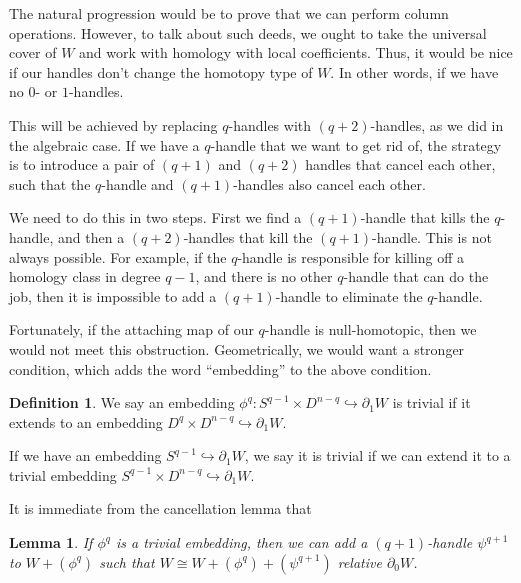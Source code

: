\documentclass[a4paper, 12pt]{article}
\newtheorem{lemma}[thm]{Lemma}
\theoremstyle{definition}
\newtheorem{defi}[thm]{Definition}
\newcommand\fakeqed{\pushQED{\qed}\qedhere}
\begin{document}
The natural progression would be to prove that we can perform column operations. However, to talk about such deeds, we ought to take the universal cover of $W$ and work with homology with local coefficients. Thus, it would be nice if our handles don't change the homotopy type of $W$. In other words, if we have no $0$- or $1$-handles.

This will be achieved by replacing $q$-handles with $(q + 2)$-handles, as we did in the algebraic case. If we have a $q$-handle that we want to get rid of, the strategy is to introduce a pair of $(q + 1)$ and $(q + 2)$ handles that cancel each other, such that the $q$-handle and $(q + 1)$-handles also cancel each other.

We need to do this in two steps. First we find a $(q + 1)$-handle that kills the $q$-handle, and then a $(q + 2)$-handles that kill the $(q + 1)$-handle. This is not always possible. For example, if the $q$-handle is responsible for killing off a homology class in degree $q - 1$, and there is no other $q$-handle that can do the job, then it is impossible to add a $(q + 1)$-handle to eliminate the $q$-handle.

Fortunately, if the attaching map of our $q$-handle is null-homotopic, then we would not meet this obstruction. Geometrically, we would want a stronger condition, which adds the word ``embedding'' to the above condition.
\begin{defi}
  We say an embedding $\phi^q: S^{q - 1} \times D^{n - q} \hookrightarrow \partial_1 W$ is trivial if it extends to an embedding $D^q \times D^{n - q} \hookrightarrow \partial_1 W$.

  If we have an embedding $S^{q - 1} \hookrightarrow \partial_1 W$, we say it is trivial if we can extend it to a trivial embedding $S^{q - 1} \times D^{n - q}\hookrightarrow \partial_1 W$.
\end{defi}

It is immediate from the cancellation lemma that
\begin{lemma}
  If $\phi^q$ is a trivial embedding, then we can add a $(q + 1)$-handle $\psi^{q + 1}$ to $W + (\phi^q)$ such that $W \cong W + (\phi^q) + (\psi^{q + 1})$ relative $\partial_0 W$.\fakeqed
\end{lemma}
\end{document}
